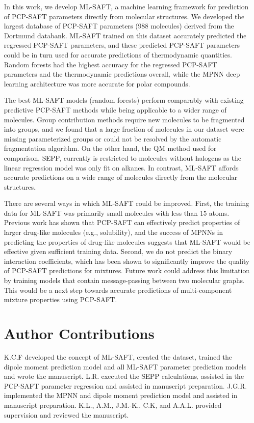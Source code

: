 In this work, we develop ML-SAFT, a machine learning framework for prediction of PCP-SAFT parameters directly from molecular structures. We developed the largest database of PCP-SAFT parameters (988 molecules) derived from the Dortmund databank. ML-SAFT trained on this dataset accurately predicted the regressed PCP-SAFT parameters, and these predicted PCP-SAFT parameters could be in turn used for accurate predictions of thermodynamic quantities. Random forests had the highest accuracy for the regressed PCP-SAFT parameters and the thermodynamic predictions overall, while the MPNN deep learning architecture was more accurate for polar compounds. 

The best ML-SAFT models (random forests) perform comparably with existing predictive PCP-SAFT methods while being applicable to a wider range of molecules. Group contribution methods require new molecules to be fragmented into groups, and we found that a large fraction of molecules in our dataset were missing parameterized groups or could not be resolved by the automatic fragmentation algorithm. On the other hand, the QM method used for comparison, SEPP, currently is restricted to molecules without halogens as the linear regression model was only fit on alkanes. In contrast, ML-SAFT affords accurate predictions on a wide range of molecules directly from the molecular structures.

There are several ways in which ML-SAFT could be improved. First, the training data for ML-SAFT was primarily small molecules with less than 15 atoms. Previous work has shown that PCP-SAFT can effectively predict properties of larger drug-like molecules (e.g., solubility),\cite{Klajmon2020} and the success of MPNNs in predicting the properties of drug-like molecules suggests that ML-SAFT would be effective given sufficient training data. Second, we do not predict the binary interaction coefficients, which has been shown to significantly improve the quality of PCP-SAFT predictions for mixtures. Future work could address this limitation by training models that contain message-passing between two molecular graphs. This would be a next step towards accurate predictions of multi-component mixture properties using PCP-SAFT.




\section{Author Contributions}

K.C.F developed the concept of ML-SAFT, created the dataset, trained the dipole moment prediction model and all ML-SAFT parameter prediction models and wrote the manuscript. L.R. executed the SEPP calculations, assisted in the PCP-SAFT parameter regression and assisted in manuscript preparation. J.G.R. implemented the MPNN and dipole moment prediction model and assisted in manuscript preparation. K.L., A.M., J.M.-K., C.K, and A.A.L. provided supervision and reviewed the manuscript.



